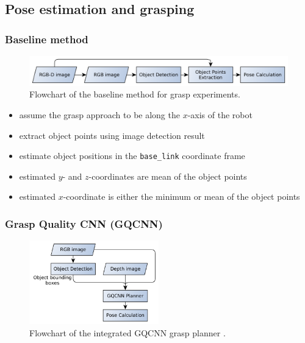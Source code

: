 \documentclass[runningheads]{../llncs}
\begin{document}
\subsection{Pose estimation and grasping}
\subsubsection{Baseline method}
\begin{figure}[h!]
    \centering
    \includegraphics[width=\textwidth]{grasp_plan_pose_estimation}
    \caption{Flowchart of the baseline method for grasp experiments.}
    \label{fig:grasp_plan_baseline}
\end{figure}

\begin{itemize}
    \item assume the grasp approach to be along the $ x $-axis of the robot
    \item extract object points using image detection result
    \item estimate object positions in the \texttt{base\_link} coordinate frame
    \item estimated $ y $- and $ z $-coordinates are mean of the object points
    \item estimated $ x $-coordinate is either the minimum or mean of the object points
\end{itemize}

\subsubsection{Grasp Quality CNN (GQCNN)}
\begin{figure}[h!]
    \centering
    \includegraphics[width=0.5\textwidth]{grasp_plan_gqcnn}
    \caption{Flowchart of the integrated GQCNN grasp planner \cite{mahler2017}.}
    \label{fig:grasp_plan_gqcnn}
\end{figure}
\end{document}
